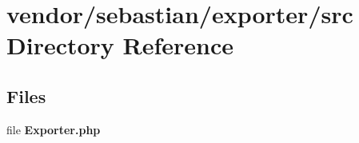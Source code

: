 \section{vendor/sebastian/exporter/src Directory Reference}
\label{dir_d31e3bd9f75b91999b0108e37482b579}
\subsection*{Files}
\begin{DoxyCompactItemize}
\item 
file {\bf Exporter.\+php}
\end{DoxyCompactItemize}
